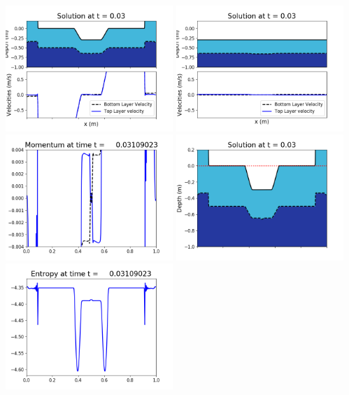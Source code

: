 \documentclass[11pt]{article}
\begin{document}
\vskip 10pt 
\includegraphics[width=0.475\textwidth]{frame0072fig1001.png}
\includegraphics[width=0.475\textwidth]{frame0072fig1002.png}
\vskip 10pt 
\includegraphics[width=0.475\textwidth]{frame0072fig1003.png}
\includegraphics[width=0.475\textwidth]{frame0072fig1006.png}
\vskip 10pt 
\includegraphics[width=0.475\textwidth]{frame0072fig1007.png}
\end{document}
